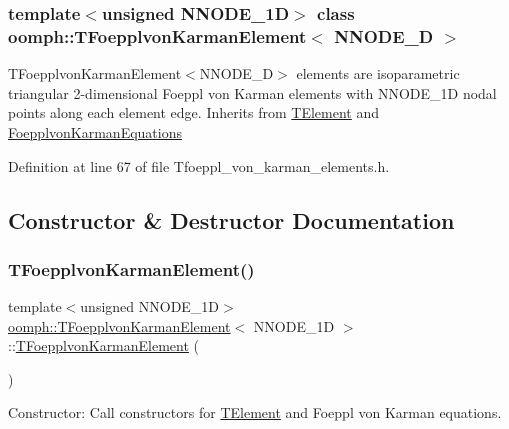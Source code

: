\subsubsection*{template$<$unsigned N\+N\+O\+D\+E\+\_\+1D$>$\newline
class oomph\+::\+T\+Foepplvon\+Karman\+Element$<$ N\+N\+O\+D\+E\+\_\+D $>$}

T\+Foepplvon\+Karman\+Element$<$\+N\+N\+O\+D\+E\+\_\+D$>$ elements are isoparametric triangular 2-\/dimensional Foeppl von Karman elements with N\+N\+O\+D\+E\+\_\+1D nodal points along each element edge. Inherits from \hyperlink{classoomph_1_1TElement}{T\+Element} and \hyperlink{classoomph_1_1FoepplvonKarmanEquations}{Foepplvon\+Karman\+Equations} 

Definition at line 67 of file Tfoeppl\+\_\+von\+\_\+karman\+\_\+elements.\+h.



\subsection{Constructor \& Destructor Documentation}
\mbox{\label{classoomph_1_1TFoepplvonKarmanElement_a1954fa12bc15c8b8f56b4596eec0696b}} 
\subsubsection{\texorpdfstring{T\+Foepplvon\+Karman\+Element()}{TFoepplvonKarmanElement()}\hspace{0.1cm}{\footnotesize\ttfamily [1/2]}}
{\footnotesize\ttfamily template$<$unsigned N\+N\+O\+D\+E\+\_\+1D$>$ \\
\hyperlink{classoomph_1_1TFoepplvonKarmanElement}{oomph\+::\+T\+Foepplvon\+Karman\+Element}$<$ N\+N\+O\+D\+E\+\_\+1D $>$\+::\hyperlink{classoomph_1_1TFoepplvonKarmanElement}{T\+Foepplvon\+Karman\+Element} (\begin{DoxyParamCaption}{ }\end{DoxyParamCaption})\hspace{0.3cm}{\ttfamily [inline]}}



Constructor\+: Call constructors for \hyperlink{classoomph_1_1TElement}{T\+Element} and Foeppl von Karman equations. 




